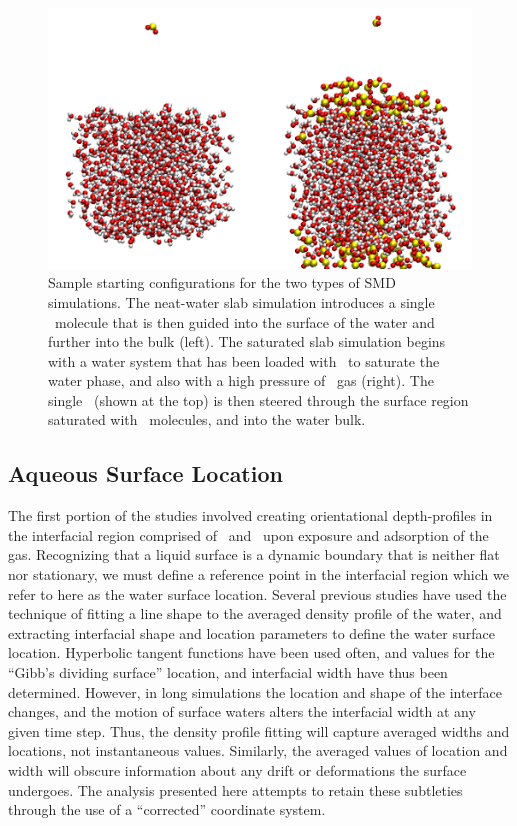 \documentclass{article}
\begin{document}
\begin{figure}[h!]
	\begin{center}
		\includegraphics[scale=1.0]{startingconfigurations.png}
		\caption{Sample starting configurations for the two types of SMD simulations. The neat-water slab simulation introduces a single \suldiox~molecule that is then guided into the surface of the water and further into the bulk (left). The saturated slab simulation begins with a water system that has been loaded with \suldiox~to saturate the water phase, and also with a high pressure of \suldiox~gas (right). The single \suldiox~(shown at the top) is then steered through the surface region saturated with \suldiox~molecules, and into the water bulk.}
		\label{fig:starting-configurations}
	\end{center}
\end{figure}

\subsection {Aqueous Surface Location}

	The first portion of the studies involved creating orientational depth-profiles in the interfacial region comprised of \suldiox~and \wat~upon exposure and adsorption of the gas. Recognizing that a liquid surface is a dynamic boundary that is neither flat nor stationary, we must define a reference point in the interfacial region which we refer to here as the water surface location. Several previous studies have used the technique of fitting a line shape to the averaged density profile of the water, and extracting interfacial shape and location parameters to define the water surface location.\cite{Shamay2010,Wick2006c,Chowdhary2006} Hyperbolic tangent functions have been used often, and values for the ``Gibb's dividing surface'' location, and interfacial width have thus been determined.\cite{Matsumoto1988} However, in long simulations the location and shape of the interface changes, and the motion of surface waters alters the interfacial width at any given time step. Thus, the density profile fitting will capture averaged widths and locations, not instantaneous values. Similarly, the averaged values of location and width will obscure information about any drift or deformations the surface undergoes. The analysis presented here attempts to retain these subtleties through the use of a ``corrected'' coordinate system.
	
\end{document}
